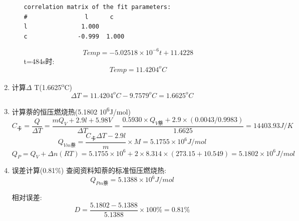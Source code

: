 \documentclass[11pt]{report}
\begin{document}
\begin{enumerate}
\begin{enumerate}
\begin{verbatim}
correlation matrix of the fit parameters:
#                l      c      
l               1.000 
c              -0.999  1.000 
\end{verbatim}
\[
Temp=-5.02518\times 10^{-6}t+11.4228
\]
t=484s时:
\[
Temp=11.4204^{o}C
\]
\end{enumerate}
\item 计算\(\Delta\) T(1.6625\textsuperscript{o}C)
\label{sec:orgb783127}
\[
     \Delta T=11.4204^{o}C-9.7579^{o}C=1.6625^{o}C
     \]

\item 计算萘的恒压燃烧热(5.1802\texttimes{} 10\textsuperscript{6}J/mol)
\label{sec:orgb887f1d}
\[
     C_{卡}=
     \frac{Q}{\Delta T}=
     \frac{mQ_{V}+2.9l+5.98V}{\Delta T}=
     \frac{0.5930\times Q_{V萘}+2.9\times(0.0043/0.9983)}{1.6625}=
     14403.93J/K
     \]
\[
     Q_{Vm萘}=
     \frac{C_{卡}\Delta T-2.9l}{m}\times M=
     5.1755\times 10^{6}J/mol
     \]
\[
     Q_{P}=Q_{V}+\Delta n(RT)=5.1755\times 10^{6}+2\times 8.314 \times (273.15+10.549)=
     5.1802\times 10^{6}J/mol
     \]
\item 误差计算(0.81\%)
\label{sec:org7226bae}
查阅资料知萘的标准恒压燃烧热:
\[
     Q_{Pm萘}= 5.1388\times 10^6 J/mol
     \]

相对误差:
\[
     D=\frac{5.1802-5.1388}{5.1388}\times 100\%=0.81\%
     \]
\end{enumerate}
\end{document}

